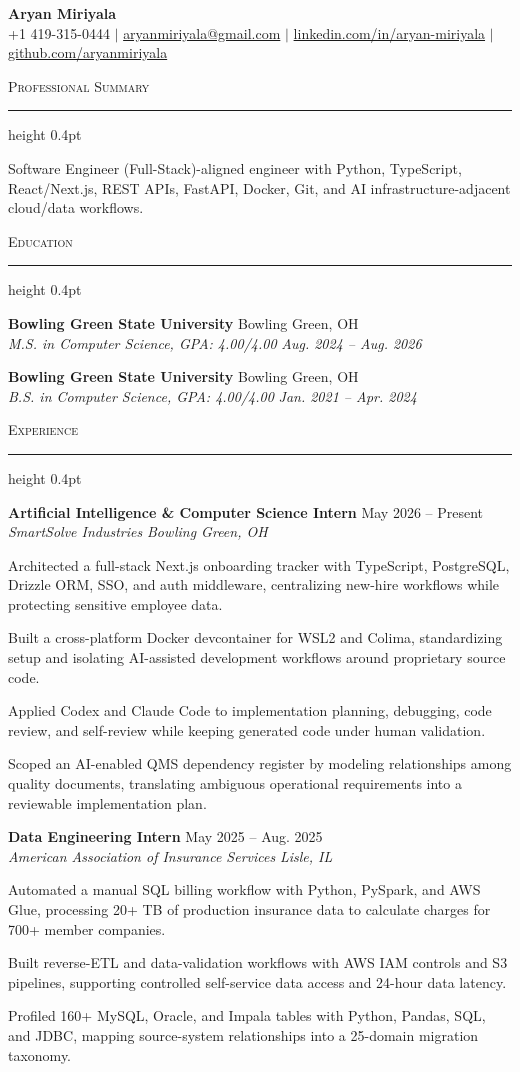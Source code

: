\documentclass[letterpaper,11pt]{article}
\newcommand{\resumesection}[1]{%
  \par\vspace{2pt}%
  {\large\scshape #1}\par\vspace{2pt}%
  \hrule height 0.4pt\vspace{2pt}%
}
\newcommand{\resumeSubheading}[4]{
  \textbf{#1} \hfill #2\\
  \textit{#3} \hfill \textit{#4}
}
\begin{document}
\begin{center}
  {\LARGE \textbf{Aryan Miriyala}}\\[-1pt]
  \small
  +1 419-315-0444 $|$
  \href{mailto:aryanmiriyala@gmail.com}{aryanmiriyala@gmail.com} $|$
  \href{https://www.linkedin.com/in/aryan-miriyala-7788a21b6/}{linkedin.com/in/aryan-miriyala} $|$
  \href{https://github.com/aryanmiriyala}{github.com/aryanmiriyala}
\end{center}\vspace{-10pt}

\resumesection{Professional Summary}
Software Engineer (Full-Stack)-aligned engineer with Python, TypeScript, React/Next.js, REST APIs, FastAPI, Docker, Git, and AI infrastructure-adjacent cloud/data workflows.

\resumesection{Education}
\resumeSubheading
{Bowling Green State University}{Bowling Green, OH}
{M.S. in Computer Science, GPA: 4.00/4.00}{Aug. 2024 -- Aug. 2026}

\resumeSubheading
{Bowling Green State University}{Bowling Green, OH}
{B.S. in Computer Science, GPA: 4.00/4.00}{Jan. 2021 -- Apr. 2024}

\resumesection{Experience}
\resumeSubheading
{Artificial Intelligence \& Computer Science Intern}{May 2026 -- Present}
{SmartSolve Industries}{Bowling Green, OH}
\begin{tightitemize}
  \item Architected a full-stack Next.js onboarding tracker with TypeScript, PostgreSQL, Drizzle ORM, SSO, and auth middleware, centralizing new-hire workflows while protecting sensitive employee data.
  \item Built a cross-platform Docker devcontainer for WSL2 and Colima, standardizing setup and isolating AI-assisted development workflows around proprietary source code.
  \item Applied Codex and Claude Code to implementation planning, debugging, code review, and self-review while keeping generated code under human validation.
  \item Scoped an AI-enabled QMS dependency register by modeling relationships among quality documents, translating ambiguous operational requirements into a reviewable implementation plan.
\end{tightitemize}

\resumeSubheading
{Data Engineering Intern}{May 2025 -- Aug. 2025}
{American Association of Insurance Services}{Lisle, IL}
\begin{tightitemize}
  \item Automated a manual SQL billing workflow with Python, PySpark, and AWS Glue, processing 20+ TB of production insurance data to calculate charges for 700+ member companies.
  \item Built reverse-ETL and data-validation workflows with AWS IAM controls and S3 pipelines, supporting controlled self-service data access and 24-hour data latency.
  \item Profiled 160+ MySQL, Oracle, and Impala tables with Python, Pandas, SQL, and JDBC, mapping source-system relationships into a 25-domain migration taxonomy.
\end{tightitemize}
\end{document}
